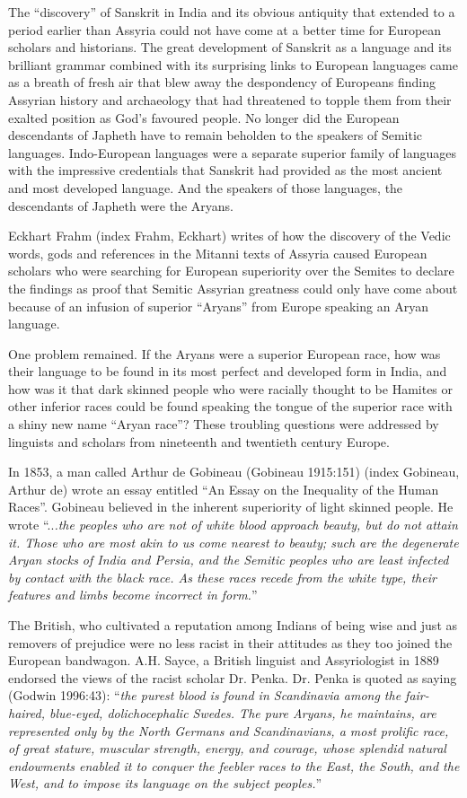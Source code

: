 The “discovery” of Sanskrit in India and its obvious antiquity that extended to a period earlier than Assyria could not have come at a better time for European scholars and historians. The great development of Sanskrit as a language and its brilliant grammar combined with its surprising links to European languages came as a breath of fresh air that blew away the despondency of Europeans finding Assyrian history and archaeology that had threatened to topple them from their exalted position as God's favoured people. No longer did the European descendants of Japheth have to remain beholden to the speakers of Semitic languages. Indo-European languages were a separate superior family of languages with the impressive credentials that Sanskrit had provided as the most ancient and most developed language. And the speakers of those languages, the descendants of Japheth were the Aryans.

Eckhart Frahm (index Frahm, Eckhart) writes of how the discovery of the Vedic words, gods and references in the Mitanni texts of Assyria caused European scholars who were searching for European superiority over the Semites to declare the findings as proof that Semitic Assyrian greatness could only have come about because of an infusion of superior “Aryans” from Europe speaking an Aryan language.

One problem remained. If the Aryans were a superior European race, how was their language to be found in its most perfect and developed form in India, and how was it that dark skinned people who were racially thought to be Hamites or other inferior races could be found speaking the tongue of the superior race with a shiny new name “Aryan race”? These troubling questions were addressed by linguists and scholars from nineteenth and twentieth century Europe.

In 1853, a man called Arthur de Gobineau (Gobineau 1915:151) (index Gobineau, Arthur de) wrote an essay entitled “An Essay on the Inequality of the Human Races”. Gobineau believed in the inherent superiority of light skinned people. He wrote “..\textit{.the peoples who are not of white blood approach beauty, but do not attain it. Those who are most akin to us come nearest to beauty; such are the degenerate Aryan stocks of India and Persia, and the Semitic peoples who are least infected by contact with the black race. As these races recede from the white type, their features and limbs become incorrect in form.}”

The British, who cultivated a reputation among Indians of being wise and just as removers of prejudice were no less racist in their attitudes as they too joined the European bandwagon. A.H. Sayce, a British linguist and Assyriologist in 1889 endorsed the views of the racist scholar Dr. Penka. Dr. Penka is quoted as saying (Godwin 1996:43): “\textit{the purest blood is found in Scandinavia among the fair-haired, blue-eyed, dolichocephalic Swedes. The pure Aryans, he maintains, are represented only by the North Germans and Scandinavians, a most prolific race, of great stature, muscular strength, energy, and courage, whose splendid natural endowments enabled it to conquer the feebler races to the East, the South, and the West, and to impose its language on the subject peoples.}”

